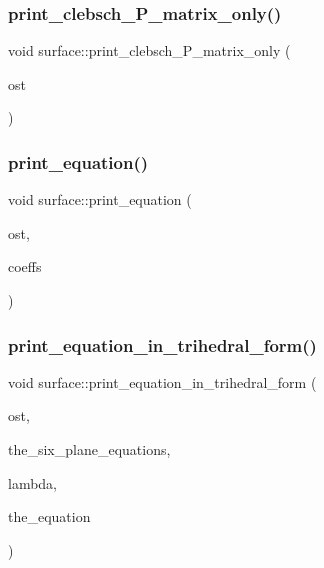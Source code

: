 \mbox{\label{classsurface_a38b901facf5122e9676375891edc34ff}} 
\subsubsection{\texorpdfstring{print\+\_\+clebsch\+\_\+\+P\+\_\+matrix\+\_\+only()}{print\_clebsch\_P\_matrix\_only()}}
{\footnotesize\ttfamily void surface\+::print\+\_\+clebsch\+\_\+\+P\+\_\+matrix\+\_\+only (\begin{DoxyParamCaption}\item[{ostream \&}]{ost }\end{DoxyParamCaption})}

\mbox{\label{classsurface_a4c7be78ebc2a599c08f5a27c50da518b}} 
\subsubsection{\texorpdfstring{print\+\_\+equation()}{print\_equation()}}
{\footnotesize\ttfamily void surface\+::print\+\_\+equation (\begin{DoxyParamCaption}\item[{ostream \&}]{ost,  }\item[{\mbox{\hyperlink{galois_8h_a09fddde158a3a20bd2dcadb609de11dc}{I\+NT}} $\ast$}]{coeffs }\end{DoxyParamCaption})}

\mbox{\label{classsurface_a9e0d320e0f9b9616ed552cd8243a7866}} 
\subsubsection{\texorpdfstring{print\+\_\+equation\+\_\+in\+\_\+trihedral\+\_\+form()}{print\_equation\_in\_trihedral\_form()}}
{\footnotesize\ttfamily void surface\+::print\+\_\+equation\+\_\+in\+\_\+trihedral\+\_\+form (\begin{DoxyParamCaption}\item[{ostream \&}]{ost,  }\item[{\mbox{\hyperlink{galois_8h_a09fddde158a3a20bd2dcadb609de11dc}{I\+NT}} $\ast$}]{the\+\_\+six\+\_\+plane\+\_\+equations,  }\item[{\mbox{\hyperlink{galois_8h_a09fddde158a3a20bd2dcadb609de11dc}{I\+NT}}}]{lambda,  }\item[{\mbox{\hyperlink{galois_8h_a09fddde158a3a20bd2dcadb609de11dc}{I\+NT}} $\ast$}]{the\+\_\+equation }\end{DoxyParamCaption})}

